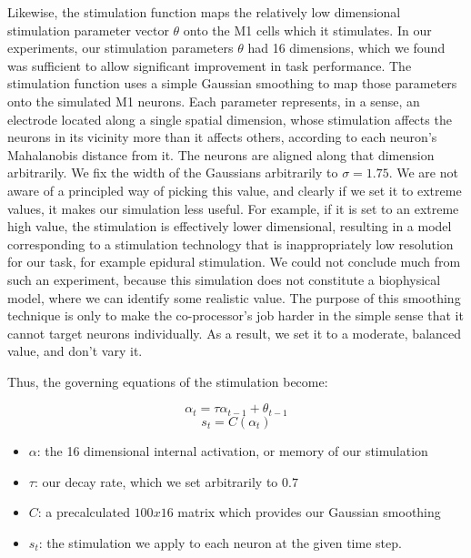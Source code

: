 \documentclass[12pt]{iopart}
\begin{document}
Likewise, the stimulation function maps the relatively low dimensional stimulation
parameter vector $\theta$ onto the M1 cells which it stimulates. In our experiments,
our stimulation parameters $\theta$ had 16 dimensions, which we found was
sufficient to allow significant improvement in task performance. The stimulation
function uses a simple Gaussian smoothing to map those parameters onto the simulated
M1 neurons. Each parameter represents, in a sense, an electrode located along a single
spatial dimension, whose stimulation affects the neurons in its vicinity more than
it affects others, according to each neuron's Mahalanobis distance from it. The neurons
are aligned along that dimension arbitrarily. We fix the width of the Gaussians
arbitrarily to $\sigma=1.75$. We are not aware of a principled way of picking this
value, and clearly if we set it to extreme values, it makes our simulation less useful.
For example, if it is set to an extreme high value, the stimulation is effectively
lower dimensional, resulting in a model corresponding to a stimulation technology that
is inappropriately low resolution for our task, for example epidural stimulation.
We could not conclude much from such an experiment, because this simulation does
not constitute a biophysical model, where we can identify some realistic value. The
purpose of this smoothing technique is only to make the co-processor's job harder in
the simple sense that it cannot target neurons individually. As a result, we set it
to a moderate, balanced value, and don't vary it.

Thus, the governing equations of the stimulation become:

\begin{equation}
\alpha_{t} = \tau\alpha_{t-1} + \theta_{t-1}
\end{equation}
\begin{equation}
s_{t} = C(\alpha_{t})
\end{equation}

\begin{itemize}
	\item $\alpha$: the 16 dimensional internal activation, or memory
        of our stimulation
	\item $\tau$: our decay rate, which we set arbitrarily to $0.7$
	\item $C$: a precalculated $100 x 16$ matrix which provides our
	Gaussian smoothing
	\item $s_{t}$: the stimulation we apply to each neuron at the
	given time step.
\end{itemize}
\end{document}
